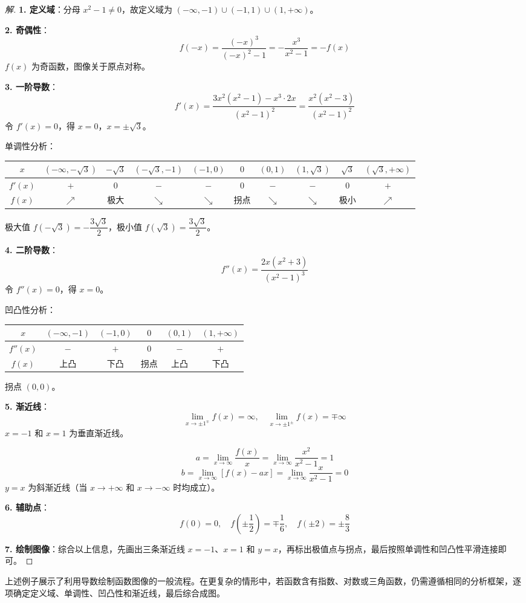 \begin{proof}[解]
	\textbf{1. 定义域}：分母 $x^2-1\neq0$，故定义域为 $(-\infty,-1)\cup(-1,1)\cup(1,+\infty)$。

	\textbf{2. 奇偶性}：
	\[
	f(-x)=\frac{(-x)^3}{(-x)^2-1}=-\frac{x^3}{x^2-1}=-f(x)
	\]
	$f(x)$ 为奇函数，图像关于原点对称。

	\textbf{3. 一阶导数}：
	\[
	f'(x)=\frac{3x^2(x^2-1)-x^3\cdot 2x}{(x^2-1)^2}=\frac{x^2(x^2-3)}{(x^2-1)^2}
	\]
	令 $f'(x)=0$，得 $x=0$，$x=\pm\sqrt{3}$。

	单调性分析：

	\begin{center}
		\begin{tabular}{c|ccccccccc}
			$x$ & $(-\infty,-\sqrt{3})$ & $-\sqrt{3}$ & $(-\sqrt{3},-1)$ & $(-1,0)$ & $0$ & $(0,1)$ & $(1,\sqrt{3})$ & $\sqrt{3}$ & $(\sqrt{3},+\infty)$ \\
			\hline
			$f'(x)$ & $+$ & $0$ & $-$ & $-$ & $0$ & $-$ & $-$ & $0$ & $+$ \\
			$f(x)$ & $\nearrow$ & 极大 & $\searrow$ & $\searrow$ & 拐点 & $\searrow$ & $\searrow$ & 极小 & $\nearrow$
		\end{tabular}
	\end{center}

	极大值 $f(-\sqrt{3})=-\dfrac{3\sqrt{3}}{2}$，极小值 $f(\sqrt{3})=\dfrac{3\sqrt{3}}{2}$。

	\textbf{4. 二阶导数}：
	\[
	f''(x)=\frac{2x(x^2+3)}{(x^2-1)^3}
	\]
	令 $f''(x)=0$，得 $x=0$。

	凹凸性分析：

	\begin{center}
		\begin{tabular}{c|ccccc}
			$x$ & $(-\infty,-1)$ & $(-1,0)$ & $0$ & $(0,1)$ & $(1,+\infty)$ \\
			\hline
			$f''(x)$ & $-$ & $+$ & $0$ & $-$ & $+$ \\
			$f(x)$ & 上凸 & 下凸 & 拐点 & 上凸 & 下凸
		\end{tabular}
	\end{center}

	拐点 $(0,0)$。

	\textbf{5. 渐近线}：
	\[
	\lim_{x\to\pm 1^{\mp}}f(x)=\infty,\quad \lim_{x\to\pm 1^{\pm}}f(x)=\mp\infty
	\]
	$x=-1$ 和 $x=1$ 为垂直渐近线。

	\[
	a=\lim_{x\to\infty}\frac{f(x)}{x}=\lim_{x\to\infty}\frac{x^2}{x^2-1}=1
	\]
	\[
	b=\lim_{x\to\infty}[f(x)-ax]=\lim_{x\to\infty}\frac{x}{x^2-1}=0
	\]
	$y=x$ 为斜渐近线（当 $x\to+\infty$ 和 $x\to-\infty$ 时均成立）。

	\textbf{6. 辅助点}：
	\[
	f(0)=0,\quad f\left(\pm\frac{1}{2}\right)=\mp\frac{1}{6},\quad f(\pm 2)=\pm\frac{8}{3}
	\]

	\textbf{7. 绘制图像}：综合以上信息，先画出三条渐近线 $x=-1$、$x=1$ 和 $y=x$，再标出极值点与拐点，最后按照单调性和凹凸性平滑连接即可。
\end{proof}

上述例子展示了利用导数绘制函数图像的一般流程。在更复杂的情形中，若函数含有指数、对数或三角函数，仍需遵循相同的分析框架，逐项确定定义域、单调性、凹凸性和渐近线，最后综合成图。
